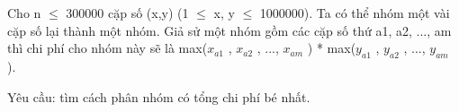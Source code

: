 Cho n $\le$ 300000 cặp số (x,y) (1 $\le$ x, y $\le$ 1000000). Ta có thể nhóm một vài cặp số lại thành một nhóm. Giả sử một nhóm gồm các cặp số thứ a1, a2, ..., am thì chi phí cho nhóm này sẽ là max($x_{a1}$   , $x_{a2}$   , ..., $x_{am}$   ) * max($y_{a1}$   , $y_{a2}$   , ..., $y_{am}$   ).  

   Yêu cầu: tìm cách phân nhóm có tổng chi phí bé nhất.